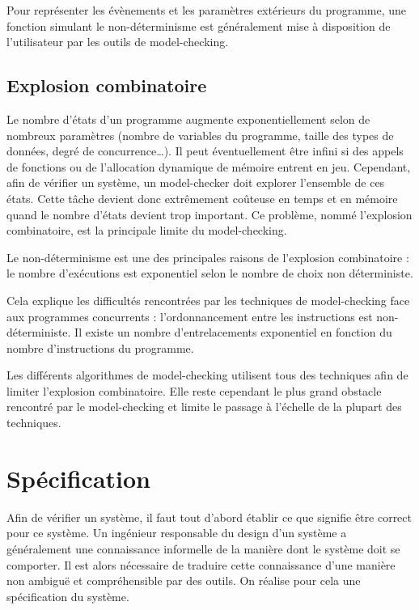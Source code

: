 Pour représenter les évènements et les paramètres extérieurs du programme,
une fonction simulant le non-déterminisme est généralement mise à disposition
de l'utilisateur par les outils de model-checking.

\subsection{Explosion combinatoire}

Le nombre d'états d'un programme augmente exponentiellement selon de nombreux
paramètres (nombre de variables du programme, taille des types de données, degré
de concurrence\dots). Il peut éventuellement être infini si des appels de
fonctions ou de l'allocation dynamique de mémoire entrent en jeu. Cependant, afin
de vérifier un système, un model-checker doit explorer l'ensemble de ces états.
Cette tâche devient donc extrêmement coûteuse en temps et en mémoire quand le
nombre d'états devient trop important.
Ce problème, nommé l'explosion combinatoire, est la principale limite du
model-checking.

Le non-déterminisme est une des principales raisons de l'explosion combinatoire :
le nombre d'exécutions est exponentiel selon le nombre de choix non déterministe.

Cela explique les difficultés rencontrées par les techniques de model-checking
face aux programmes concurrents : l'ordonnancement entre les instructions est
non-déterministe. Il existe un nombre d'entrelacements exponentiel en fonction
du nombre d'instructions du programme.

Les différents algorithmes de model-checking utilisent tous des
techniques afin de limiter l'explosion combinatoire. Elle reste
cependant le plus grand obstacle rencontré par le model-checking et
limite le passage à l'échelle de la plupart des techniques.

\section{Spécification}\label{sec:specification}

Afin de vérifier un système, il faut tout d'abord établir ce que signifie être
correct pour ce système. Un ingénieur responsable du design d'un système a
généralement une connaissance informelle de la manière dont le système doit se
comporter. Il est alors nécessaire de traduire cette connaissance d'une manière
non ambiguë et compréhensible par des outils. On réalise pour cela une
spécification du système.

